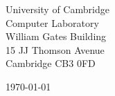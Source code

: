 \begin{minipage}{0.49\textwidth}
\begin{flushleft}
\noindent
University of Cambridge\\
Computer Laboratory\\
William Gates Building\\
15 JJ Thomson Avenue\\
Cambridge CB3 0FD
\end{flushleft}
\end{minipage}
\begin{minipage}{0.47\textwidth}
\begin{flushright}
\today
\end{flushright}
\end{minipage} \\

\newcommand{\univ}{University of Cambridge}
\newcommand{\univshort}{Cambridge}
\newcommand{\degree}{Ph.D.}
\newcommand{\dept}{Computer Science}

